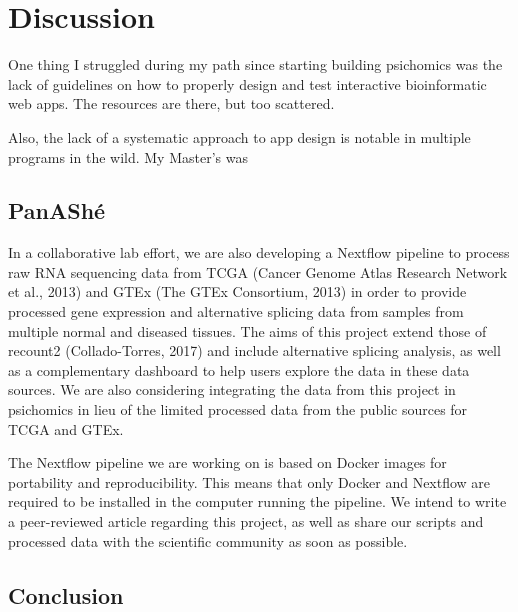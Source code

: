 \chapter{Discussion}

One thing I struggled during my path since starting building psichomics was the lack of guidelines on how to properly design and test interactive bioinformatic web apps. The resources are there, but too scattered.

Also, the lack of a systematic approach to app design is notable in multiple programs in the wild. My Master's was 

\section{PanAShé}

In a collaborative lab effort, we are also developing a Nextflow pipeline to process raw RNA sequencing data from TCGA (Cancer Genome Atlas Research Network et al., 2013) and GTEx (The GTEx Consortium, 2013) in order to provide processed gene expression and alternative splicing data from samples from multiple normal and diseased tissues. The aims of this project extend those of recount2 (Collado-Torres, 2017) and include alternative splicing analysis, as well as a complementary dashboard to help users explore the data in these data sources. We are also considering integrating the data from this project in psichomics in lieu of the limited processed data from the public sources for TCGA and GTEx.

The Nextflow pipeline we are working on is based on Docker images for portability and reproducibility. This means that only Docker and Nextflow are required to be installed in the computer running the pipeline. We intend to write a peer-reviewed article regarding this project, as well as share our scripts and processed data with the scientific community as soon as possible.

\section{Conclusion}